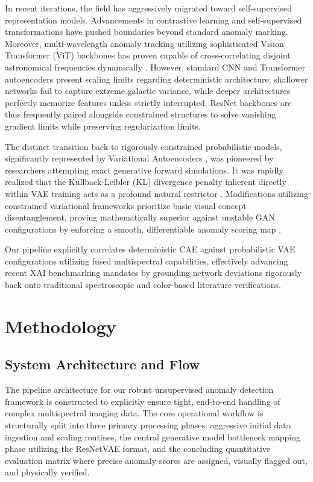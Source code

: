 \documentclass[conference]{IEEEtran}
\begin{document}
In recent iterations, the field has aggressively migrated toward self-supervised representation models. Advancements in contrastive learning \cite{Smith2024} and self-supervised transformations \cite{Stein2022} have pushed boundaries beyond standard anomaly marking. Moreover, multi-wavelength anomaly tracking utilizing sophisticated Vision Transformer (ViT) backbones has proven capable of cross-correlating disjoint astronomical frequencies dynamically \cite{Chen2024}. However, standard CNN and Transformer autoencoders present scaling limits regarding deterministic architecture; shallower networks fail to capture extreme galactic variance, while deeper architectures perfectly memorize features unless strictly interrupted. ResNet backbones \cite{He2016} are thus frequently paired alongside constrained structures to solve vanishing gradient limits while preserving regularization limits.

The distinct transition back to rigorously constrained probabilistic models, significantly represented by Variational Autoencoders \cite{Kingma2013}, was pioneered by researchers attempting exact generative forward simulations. It was rapidly realized that the Kullback-Leibler (KL) divergence penalty inherent directly within VAE training acts as a profound natural restrictor \cite{Margalef2020}. Modifications utilizing constrained variational frameworks \cite{Higgins2017} prioritize basic visual concept disentanglement, proving mathematically superior against unstable GAN configurations by enforcing a smooth, differentiable anomaly scoring map \cite{Lin2024}. 

Our pipeline explicitly correlates deterministic CAE against probabilistic VAE configurations utilizing fused multispectral capabilities, effectively advancing recent XAI benchmarking mandates \cite{Dominguez2023} by grounding network deviations rigorously back onto traditional spectroscopic and color-based literature verifications.

\section{Methodology}

\subsection{System Architecture and Flow}
The pipeline architecture for our robust unsupervised anomaly detection framework is constructed to explicitly ensure tight, end-to-end handling of complex multispectral imaging data. The core operational workflow is structurally split into three primary processing phases: aggressive initial data ingestion and scaling routines, the central generative model bottleneck mapping phase utilizing the ResNetVAE format, and the concluding quantitative evaluation matrix where precise anomaly scores are assigned, visually flagged out, and physically verified. 
\end{document}
